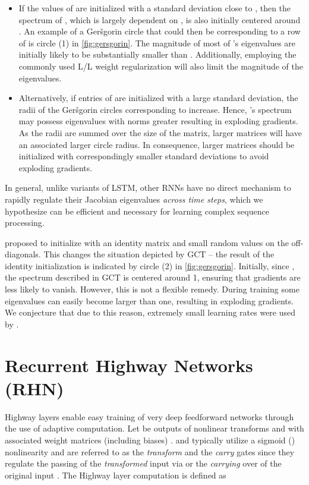 \documentclass[letterpaper]{article}
\def\gers{Ger\v{s}gorin}
\def\gct{GCT}
\def\Arch{Recurrent Highway Network} \def\arch{RHN}
\begin{document}
\begin{itemize}\item If the values of  are initialized with a standard deviation close to , then the spectrum of , which is largely dependent on , is also initially centered around . An example of a \gers{} circle that could then be corresponding to a row of  is circle (1) in \autoref{fig:gersgorin}.
The magnitude of most of 's eigenvalues  are initially likely to be substantially smaller than .
Additionally, employing the commonly used L/L weight regularization will also limit the magnitude of the eigenvalues.

\item Alternatively, if entries of  are initialized with a large standard deviation, the radii of the \gers{} circles corresponding to  increase. Hence, 's spectrum may possess eigenvalues with norms greater  resulting in exploding gradients.
As the radii are summed over the size of the matrix, larger matrices will have an associated larger circle radius.
In consequence, larger matrices should be initialized with correspondingly smaller standard deviations to avoid exploding gradients.

\end{itemize}

In general, unlike variants of LSTM, other RNNs have no direct mechanism to rapidly regulate their Jacobian eigenvalues \emph{across time steps}, which we hypothesize can be efficient and necessary for learning complex sequence processing.

\citet{identity_rnn} proposed to initialize  with an identity matrix and small random values on the off-diagonals.
This changes the situation depicted by \gct{} -- the result of the identity initialization is indicated by circle (2) in \autoref{fig:gersgorin}.
Initially, since , the spectrum described in \gct{} is centered around 1, ensuring that gradients are less likely to vanish.
However, this is not a flexible remedy.
During training some eigenvalues can easily become larger than one, resulting in exploding gradients.
We conjecture that due to this reason, extremely small learning rates were used by \citet{identity_rnn}.

\section{\Arch{}s (\arch{})}\label{sec:highway_rnn}
Highway layers \citep{highways} enable easy training of very deep feedforward networks through the use of adaptive computation.
Let  be outputs of nonlinear transforms  and  with associated weight matrices (including biases) .
 and  typically utilize a sigmoid () nonlinearity and are referred to as the \textit{transform} and the \textit{carry} gates since they regulate the passing of the \textit{transformed} input via  or the \textit{carrying} over of the original input .
The Highway layer computation is defined as
\end{document}
